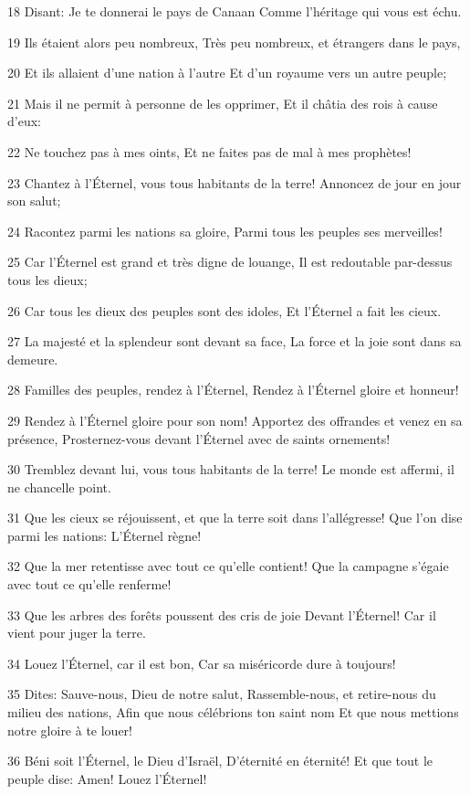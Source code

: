 \par 18 Disant: Je te donnerai le pays de Canaan Comme l'héritage qui vous est échu.
\par 19 Ils étaient alors peu nombreux, Très peu nombreux, et étrangers dans le pays,
\par 20 Et ils allaient d'une nation à l'autre Et d'un royaume vers un autre peuple;
\par 21 Mais il ne permit à personne de les opprimer, Et il châtia des rois à cause d'eux:
\par 22 Ne touchez pas à mes oints, Et ne faites pas de mal à mes prophètes!
\par 23 Chantez à l'Éternel, vous tous habitants de la terre! Annoncez de jour en jour son salut;
\par 24 Racontez parmi les nations sa gloire, Parmi tous les peuples ses merveilles!
\par 25 Car l'Éternel est grand et très digne de louange, Il est redoutable par-dessus tous les dieux;
\par 26 Car tous les dieux des peuples sont des idoles, Et l'Éternel a fait les cieux.
\par 27 La majesté et la splendeur sont devant sa face, La force et la joie sont dans sa demeure.
\par 28 Familles des peuples, rendez à l'Éternel, Rendez à l'Éternel gloire et honneur!
\par 29 Rendez à l'Éternel gloire pour son nom! Apportez des offrandes et venez en sa présence, Prosternez-vous devant l'Éternel avec de saints ornements!
\par 30 Tremblez devant lui, vous tous habitants de la terre! Le monde est affermi, il ne chancelle point.
\par 31 Que les cieux se réjouissent, et que la terre soit dans l'allégresse! Que l'on dise parmi les nations: L'Éternel règne!
\par 32 Que la mer retentisse avec tout ce qu'elle contient! Que la campagne s'égaie avec tout ce qu'elle renferme!
\par 33 Que les arbres des forêts poussent des cris de joie Devant l'Éternel! Car il vient pour juger la terre.
\par 34 Louez l'Éternel, car il est bon, Car sa miséricorde dure à toujours!
\par 35 Dites: Sauve-nous, Dieu de notre salut, Rassemble-nous, et retire-nous du milieu des nations, Afin que nous célébrions ton saint nom Et que nous mettions notre gloire à te louer!
\par 36 Béni soit l'Éternel, le Dieu d'Israël, D'éternité en éternité! Et que tout le peuple dise: Amen! Louez l'Éternel!
